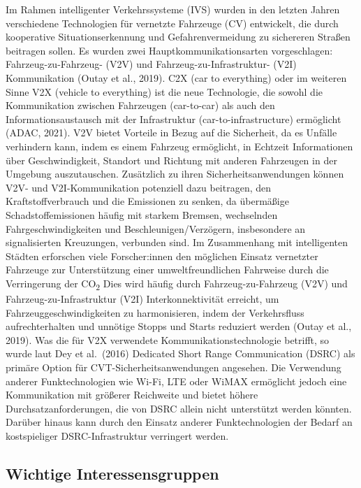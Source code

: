 \documentclass[
]{book}
\begin{document}
Im Rahmen intelligenter Verkehrssysteme (IVS) wurden in den letzten Jahren verschiedene Technologien für vernetzte Fahrzeuge (CV) entwickelt, die durch kooperative Situationserkennung und Gefahrenvermeidung zu sichereren Straßen beitragen sollen. Es wurden zwei Hauptkommunikationsarten vorgeschlagen: Fahrzeug-zu-Fahrzeug- (V2V) und Fahrzeug-zu-Infrastruktur- (V2I) Kommunikation (Outay et al., 2019). C2X (car to everything) oder im weiteren Sinne V2X (vehicle to everything) ist die neue Technologie, die sowohl die Kommunikation zwischen Fahrzeugen (car-to-car) als auch den Informationsaustausch mit der Infrastruktur (car-to-infrastructure) ermöglicht (ADAC, 2021).
V2V bietet Vorteile in Bezug auf die Sicherheit, da es Unfälle verhindern kann, indem es einem Fahrzeug ermöglicht, in Echtzeit Informationen über Geschwindigkeit, Standort und Richtung mit anderen Fahrzeugen in der Umgebung auszutauschen. Zusätzlich zu ihren Sicherheitsanwendungen können V2V- und V2I-Kommunikation potenziell dazu beitragen, den Kraftstoffverbrauch und die Emissionen zu senken, da übermäßige Schadstoffemissionen häufig mit starkem Bremsen, wechselnden Fahrgeschwindigkeiten und Beschleunigen/Verzögern, insbesondere an signalisierten Kreuzungen, verbunden sind. Im Zusammenhang mit intelligenten Städten erforschen viele Forscher:innen den möglichen Einsatz vernetzter Fahrzeuge zur Unterstützung einer umweltfreundlichen Fahrweise durch die Verringerung der CO\textsubscript{2} Dies wird häufig durch Fahrzeug-zu-Fahrzeug (V2V) und Fahrzeug-zu-Infrastruktur (V2I) Interkonnektivität erreicht, um Fahrzeuggeschwindigkeiten zu harmonisieren, indem der Verkehrsfluss aufrechterhalten und unnötige Stopps und Starts reduziert werden (Outay et al., 2019).
Was die für V2X verwendete Kommunikationstechnologie betrifft, so wurde laut Dey et al.~(2016) Dedicated Short Range Communication (DSRC) als primäre Option für CVT-Sicherheitsanwendungen angesehen. Die Verwendung anderer Funktechnologien wie Wi-Fi, LTE oder WiMAX ermöglicht jedoch eine Kommunikation mit größerer Reichweite und bietet höhere Durchsatzanforderungen, die von DSRC allein nicht unterstützt werden könnten. Darüber hinaus kann durch den Einsatz anderer Funktechnologien der Bedarf an kostspieliger DSRC-Infrastruktur verringert werden.

\hypertarget{wichtige-interessensgruppen-18}{%
\subsection*{Wichtige Interessensgruppen}\label{wichtige-interessensgruppen-18}}
\end{document}
